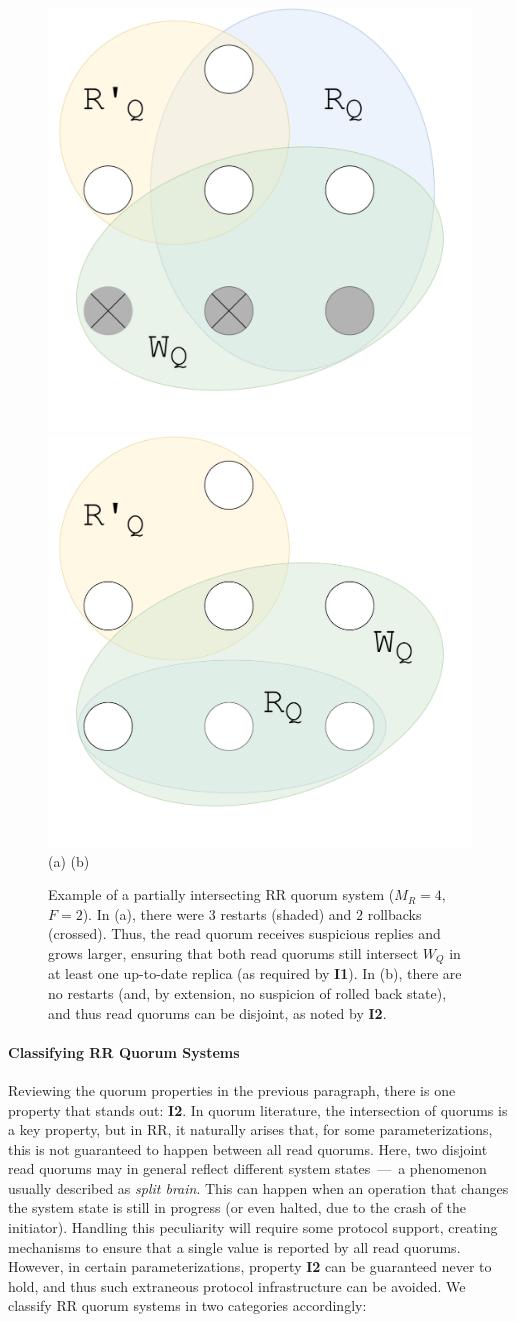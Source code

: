 \begin{figure}[t]
    \centering
        \includegraphics[width=.32\linewidth]{img/RR_quorums_I1}
        \includegraphics[width=.32\linewidth]{img/RR_quorums_I2}\\
        (a) \hspace{2.3cm} (b) \hspace{.2cm}
    \caption{Example of a partially intersecting \ac{RR} quorum system ($M_R=4$,
    $F=2$). In (a), there were $3$ restarts (shaded) and $2$ rollbacks
    (crossed). Thus, the read quorum receives suspicious replies and
    grows larger, ensuring that both read quorums still intersect $W_Q$ in
    at least one up-to-date replica (as required by \textbf{I1}).
    In (b), there are no restarts (and, by extension, no
    suspicion of rolled back state), and thus read quorums can be
    disjoint, as noted by \textbf{I2}.}\label{fig:quorums}
\end{figure}

\paragraph{Classifying \ac{RR} Quorum Systems}
Reviewing the quorum properties in the previous paragraph,
there is one property that stands out: \textbf{I2}. In quorum
literature, the intersection of quorums is a key property, but
in \ac{RR}, it naturally arises that, for some
parameterizations, this is not guaranteed to happen between all
read quorums. Here, two disjoint read quorums may in general
reflect different system states~---~a phenomenon usually
described as {\em split brain}.  This can happen when an
operation that changes the system state is still in progress (or
even halted, due to the crash of the initiator). Handling this
peculiarity will require some protocol support, creating
mechanisms to ensure that a single value is reported by all read
quorums. However, in certain parameterizations, property
\textbf{I2} can be guaranteed never to hold, and thus such
extraneous protocol infrastructure can be avoided. We classify
\ac{RR} quorum systems in two categories accordingly:


